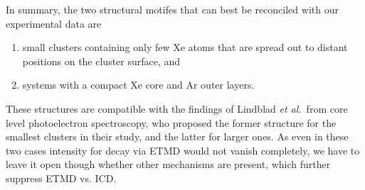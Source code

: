 In summary, the two structural motifes that can best be reconciled with our experimental data are
\begin{enumerate}
	\item small clusters containing only few Xe atoms that are spread out to distant positions on the cluster surface, and
	\item systems with a compact Xe core and Ar outer layers.
\end{enumerate}
These structures are compatible with the findings of Lindblad {\it et al.}\ from core level photoelectron spectroscopy, who proposed the former structure for the smallest clusters in their study, and the latter for larger ones.\cite{lindblad}
As even in these two cases intensity for decay via ETMD would not vanish completely, we have to leave it open though whether other mechanisms are present, which further suppress ETMD vs. ICD.
